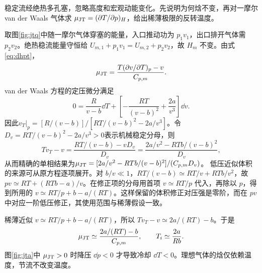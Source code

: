 \begin{exercise}[节流系数与反转温度]
稳定流经绝热多孔塞，忽略高度和宏观动能变化。先说明为何焓不变，再对一摩尔 van der Waals 气体求 $\mu_{\rm JT}=(\partial T/\partial p)_H$，给出稀薄极限的反转温度。
\end{exercise}
\begin{solution}
取图\ref{fig:jtq}中随一摩尔气体穿塞的能量，入口推动功为 $p_1v_1$，出口排开气体需 $p_2v_2$。绝热稳流能量守恒给 $U_{m,1}+p_1v_1=U_{m,2}+p_2v_2$，故 $H_m$ 不变。由式\eqref{eq:dhpt}，
\[
 \mu_{\rm JT}=\frac{T(\partial v/\partial T)_p-v}{C_{p,m}}.
\]
van der Waals 方程的定压微分满足
\[
 0=\frac R{v-b}\dd T+
 \left[-\frac{RT}{(v-b)^2}+\frac{2a}{v^3}\right]\dd v.
\]
因此$v_T|_p=[R/(v-b)]/[RT/(v-b)^2-2a/v^3]$。令$D_v=RT/(v-b)^2-2a/v^3>0$表示机械稳定分母，则
\[
 Tv_T-v=\frac{RT/(v-b)-vD_v}{D_v}
 =\frac{2a/v^2-RTb/(v-b)^2}{D_v},
\]
从而精确的单相结果为$\mu_{\rm JT}=[2a/v^2-RTb/(v-b)^2]/(C_{p,m}D_v)$。
低压近似体积的来源可从原方程逐项展开。对 $b/v\ll1$，$RT/(v-b)\simeq RT/v+RTb/v^2$，故 $pv\simeq RT+(RTb-a)/v$。在修正项的分母用首项 $v\simeq RT/p$ 代入，再除以 $p$，得到所用的 $v\simeq RT/p+b-a/(RT)$。这样保留的体积修正对压强是零阶，而在 $pv$ 中对应一阶低压修正，其使用范围与稀薄假设一致。

稀薄近似 $v\simeq RT/p+b-a/(RT)$，所以 $Tv_T-v\simeq2a/(RT)-b$。于是
\[
 \mu_{\rm JT}\simeq\frac{2a/(RT)-b}{C_{p,m}},\qquad T_i\simeq\frac{2a}{Rb}.
\]
图\ref{fig:jta}中 $\mu_{\rm JT}>0$ 时降压 $\dd p<0$ 才导致冷却 $\dd T<0$。理想气体的焓仅依赖温度，节流不改变温度。
\end{solution}

